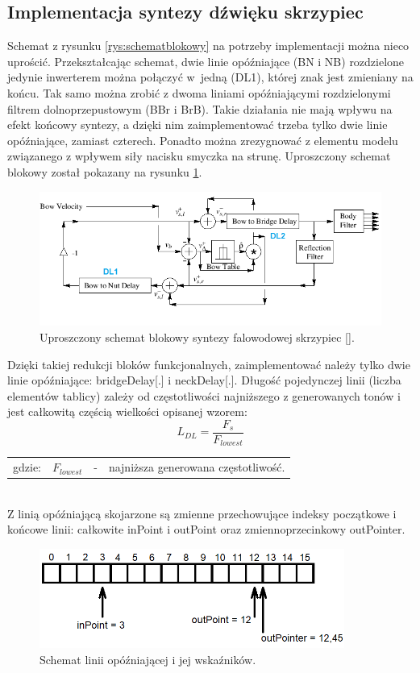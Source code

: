\subsection{Implementacja syntezy dźwięku skrzypiec}
Schemat z rysunku \ref{rys:schematblokowy} na potrzeby implementacji można nieco uprościć. Przekształcając schemat, dwie linie opóźniające (BN i NB) rozdzielone jedynie inwerterem można połączyć w~jedną (DL1), której znak jest zmieniany na końcu. Tak samo można zrobić z dwoma liniami opóźniającymi rozdzielonymi filtrem dolnoprzepustowym (BBr i BrB). Takie działania nie mają wpływu na efekt końcowy syntezy, a dzięki nim zaimplementować trzeba tylko dwie linie opóźniające, zamiast czterech. Ponadto można zrezygnować z elementu modelu związanego z wpływem siły nacisku smyczka na strunę. Uproszczony schemat blokowy został pokazany na rysunku \ref{rys:model_violin_schemat}.
\begin{figure}[H]
	\centering
	\includegraphics[width=12cm]{grafiki/model_violin_schemat}
	\captionsetup{justification=centering}
	\caption{Uproszczony schemat blokowy syntezy falowodowej skrzypiec [].}
	\label{rys:model_violin_schemat}
\end{figure}
Dzięki takiej redukcji bloków funkcjonalnych, zaimplementować należy tylko dwie linie opóźniające: bridgeDelay[.] i neckDelay[.]. Długość pojedynczej linii (liczba elementów tablicy) zależy od częstotliwości najniższego z generowanych tonów i jest całkowitą częścią wielkości opisanej wzorem:
\begin{equation} \label{equ:model_ndelays}
L_{DL} = \frac{F_s}{F_{lowest}}
\end{equation}
\begin{tabular}{ l l l l}
	gdzie: & $F_{lowest}$ &  - & najniższa generowana częstotliwość. \\
\end{tabular}\\
Z linią opóźniającą skojarzone są zmienne przechowujące indeksy początkowe i końcowe linii: całkowite inPoint i outPoint oraz zmiennoprzecinkowy outPointer. 
\begin{figure}[H]
	\centering
	\includegraphics[width=10cm]{grafiki/model_violin_wskazniki}
	\captionsetup{justification=centering}
	\caption{Schemat linii opóźniającej i jej wskaźników.}
	\label{rys:model_violin_wskazniki}
\end{figure}
